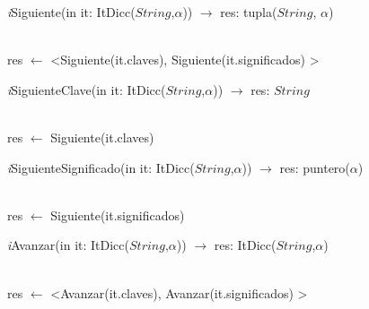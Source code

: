 \begin{Algoritmos}
\textit{i}Siguiente(in it: ItDicc($String$,$\alpha$)) $\longrightarrow$ res: tupla($String$, $\alpha$)\\
\hspace*{9mm}\\
\begin{algorithm}[H]
\BlankLine
res $\leftarrow$ <Siguiente(it.claves), Siguiente(it.significados) >
\end{algorithm}

\textit{i}SiguienteClave(in it: ItDicc($String$,$\alpha$)) $\longrightarrow$ res: $String$\\
\hspace*{9mm}\\
\begin{algorithm}[H]
\BlankLine
res $\leftarrow$ Siguiente(it.claves)
\end{algorithm}

\textit{i}SiguienteSignificado(in it: ItDicc($String$,$\alpha$)) $\longrightarrow$ res: puntero($\alpha$)\\
\hspace*{9mm}\\
\begin{algorithm}[H]
\BlankLine
res $\leftarrow$ Siguiente(it.significados)
\end{algorithm}

\textit{i}Avanzar(in it: ItDicc($String$,$\alpha$)) $\longrightarrow$  res: ItDicc($String$,$\alpha$)\\
\hspace*{9mm}\\
\begin{algorithm}[H]
\BlankLine
res $\leftarrow$ <Avanzar(it.claves), Avanzar(it.significados) >
\end{algorithm}

\end{Algoritmos}
